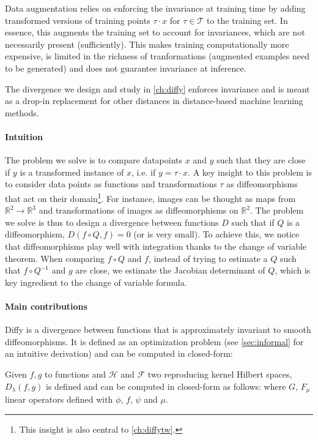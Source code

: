 Data augmentation relies on enforcing the invariance at training time by adding transformed versions of training points $\tau \cdot x$ for $\tau \in \mathcal T$ to the training set. In essence, this augments the training set to account for invariances, which are not necessarily present (sufficiently). This makes training computationally more expensive, is limited in the richness of tranformations (augmented examples need to be generated) and does not guarantee invariance at inference.

The divergence we design and study in \cref{ch:diffy} enforces invariance and is meant as a drop-in replacement for other distances in distance-based machine learning methods.

\paragraph{Intuition} The problem we solve is to compare datapoints $x$ and $y$ such that they are close if $y$ is a transformed instance of $x$, i.e. if $y = \tau \cdot x$. A key insight to this problem is to consider data points as functions and transformations $\tau$ as diffeomorphisms that act on their domain\footnote{This insight is also central to \cref{ch:diffytw}.}. For instance, images can be thought as maps from $\mathbb R^2 \to \mathbb R^3$ and transformations of images as diffeomorphisms on $\mathbb R^2$. The problem we solve is thus to design a divergence between functions $D$ such that if $Q$ is a diffeomorphism, $D(f\circ Q, f) = 0$ (or is very small). To achieve this, we notice that diffeomorphisms play well with integration thanks to the change of variable theorem. When comparing $f\circ Q$ and $f$, instead of trying to estimate a $Q$ such that $f\circ Q^{-1}$ and $g$ are close, we estimate the Jacobian determinant of $Q$, which is key ingredient to the change of variable formula.

\paragraph{Main contributions} Diffy is a divergence between functions that is approximately invariant to smooth diffeomorphisms.
It is defined as an optimization problem (see \cref{sec:informal} for an intuitive derivation) and can be computed in closed-form:
\begin{mdframed}
\begin{informaltheorem}
Given $f, g$ to functions and $\mathcal H$ and $\mathcal F$ two reproducing kernel Hilbert spaces, $D_\lambda(f, g)$ is defined and can be computed in closed-form as follows:
where $G$, $F_\mu$ linear operators defined with $\phi$, $f$, $\psi$ and $\mu$.
\end{informaltheorem}
\end{mdframed}

